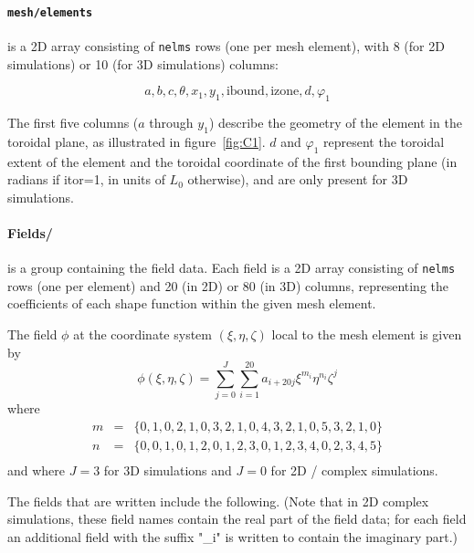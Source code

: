 \paragraph{\texttt{mesh/elements}} is a 2D array consisting of
\texttt{nelms} rows (one per mesh element), with 8 (for 2D
simulations) or 10 (for 3D simulations) columns:

\[ a, b, c, \theta, x_1, y_1, \text{ibound}, \text{izone}, d, \varphi_1 \]

The first five columns ($a$ through $y_1$) describe the geometry of
the element in the toroidal plane, as illustrated in
figure~\ref{fig:C1}.  $d$ and $\varphi_1$ represent the toroidal
extent of the element and the toroidal coordinate of the first
bounding plane (in radians if itor=1, in units of $L_0$ otherwise),
and are only present for 3D simulations.

\paragraph{Fields/} is a group containing the field data.  Each field
is a 2D array consisting of \texttt{nelms} rows (one per element) and
20 (in 2D) or 80 (in 3D) columns, representing the coefficients of
each shape function within the given mesh element.

The field $\phi$ at the coordinate system $(\xi,\eta,\zeta)$ local to the mesh element is given by
\[ 
  \phi(\xi,\eta,\zeta) = \sum_{j=0}^{J} \sum_{i=1}^{20} a_{i + 20j} \xi^{m_i} \eta^{n_i} \zeta^j
\]
where
\begin{eqnarray*}
   m & = & \{0,1,0,2,1,0,3,2,1,0,4,3,2,1,0,5,3,2,1,0 \}\\
   n & = & \{0,0,1,0,1,2,0,1,2,3,0,1,2,3,4,0,2,3,4,5 \}\\
\end{eqnarray*}
and where $J=3$ for 3D simulations and $J=0$ for 2D / complex simulations.

The fields that are written include the following.  (Note that in 2D
complex simulations, these field names contain the real part of the
field data; for each field an additional field with the suffix "\_i"
is written to contain the imaginary part.)

